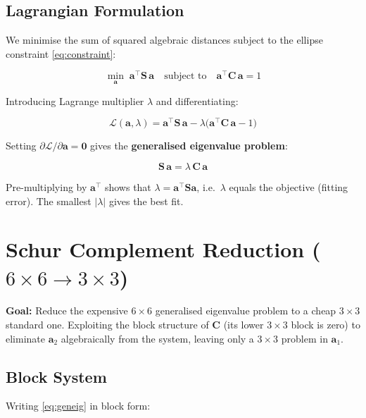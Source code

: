 \documentclass{article}
\begin{document}
	\subsection{Lagrangian Formulation}
	
	We minimise the sum of squared algebraic distances subject to
	the ellipse constraint \eqref{eq:constraint}:
	
	\begin{equation}
		\min_{\mathbf{a}}\; \mathbf{a}^\top \mathbf{S}\, \mathbf{a}
		\quad \text{subject to} \quad
		\mathbf{a}^\top \mathbf{C}\, \mathbf{a} = 1
	\end{equation}
	
	Introducing Lagrange multiplier $\lambda$ and differentiating:
	
	\begin{equation}
		\mathcal{L}(\mathbf{a}, \lambda) =
		\mathbf{a}^\top \mathbf{S}\, \mathbf{a}
		- \lambda\bigl(\mathbf{a}^\top \mathbf{C}\, \mathbf{a} - 1\bigr)
	\end{equation}
	
	Setting $\partial \mathcal{L}/\partial \mathbf{a} = \mathbf{0}$
	gives the \textbf{generalised eigenvalue problem}:
	
	\begin{equation}
		\boxed{\mathbf{S}\, \mathbf{a} = \lambda\, \mathbf{C}\, \mathbf{a}}
		\label{eq:geneig}
	\end{equation}
	
	Pre-multiplying by $\mathbf{a}^\top$ shows that
	$\lambda = \mathbf{a}^\top\mathbf{S}\mathbf{a}$, i.e.\ $\lambda$
	equals the objective (fitting error).
	The smallest $|\lambda|$ gives the best fit.
	

	\section{Schur Complement Reduction ($6\times6 \to 3\times3$)}
	
	
	\textbf{Goal:} Reduce the expensive $6\times6$ generalised
	eigenvalue problem to a cheap $3\times3$ standard one.
	Exploiting the block structure of $\mathbf{C}$
	(its lower $3\times3$ block is zero) to eliminate $\mathbf{a}_2$
	algebraically from the system, leaving only a $3\times3$
	problem in $\mathbf{a}_1$.
	
	\subsection{Block System}
	
	Writing \eqref{eq:geneig} in block form:
	
\end{document}
